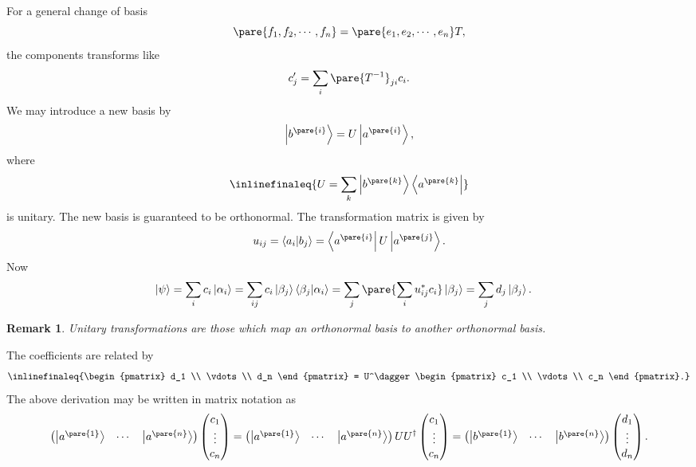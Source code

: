 \documentclass[hidelinks]{article}
\newtheorem{remark}{Remark}
\begin{document}
For a general change of basis
\[ \pare{f_1,f_2,\cdots,f_n} = \pare{e_1,e_2,\cdots,e_n}T, \]
the components transforms like
\[ c'_j = \sum_i \pare{T^{-1}}_{ji}c_i. \]
We may introduce a new basis by
\[ \ket{b^{\pare{i}}} = U\ket{a^{\pare{i}}}, \]
where
\[ \inlinefinaleq{U = \sum_k \ket{b^{\pare{k}}}\bra{a^{\pare{k}}}} \]
is unitary. The new basis is guaranteed to be orthonormal. The transformation matrix is given by
\[ u_{ij}  = \bra{a_i}\ket{b_j} = \bra{a^{\pare{i}}} U\ket{a^{\pare{j}}}. \]
Now
\begin{align*}
    \ket{\psi} &= \sum_i c_i \ket{\alpha_i} = \sum_{ij} c_i \ket{\beta_j}\bra{\beta_j}\ket{\alpha_i} = \sum_j \pare{\sum_i u^*_{ij}c_i}\ket{\beta_j} = \sum_j d_j \ket{\beta_j}.
\end{align*}
\begin{remark}
    Unitary transformations are those which map an orthonormal basis to another orthonormal basis.
\end{remark}
The coefficients are related by
\[ \inlinefinaleq{\begin{pmatrix}
    d_1 \\ \vdots \\ d_n
\end{pmatrix} = U^\dagger \begin{pmatrix}
    c_1 \\ \vdots \\ c_n
\end{pmatrix}.} \]
The above derivation may be written in matrix notation as
\[ \begin{pmatrix}
    \ket{a^{\pare{1}}} & \cdots & \ket{a^{\pare{n}}}
\end{pmatrix} \begin{pmatrix}
    c_1 \\ \vdots \\ c_n
\end{pmatrix} = \begin{pmatrix}
    \ket{a^{\pare{1}}} & \cdots & \ket{a^{\pare{n}}}
\end{pmatrix} UU^\dagger \begin{pmatrix}
    c_1 \\ \vdots \\ c_n
\end{pmatrix} = \begin{pmatrix}
    \ket{b^{\pare{1}}} & \cdots & \ket{b^{\pare{n}}}
\end{pmatrix} \begin{pmatrix}
    d_1 \\ \vdots \\ d_n
\end{pmatrix}. \]
\end{document}

